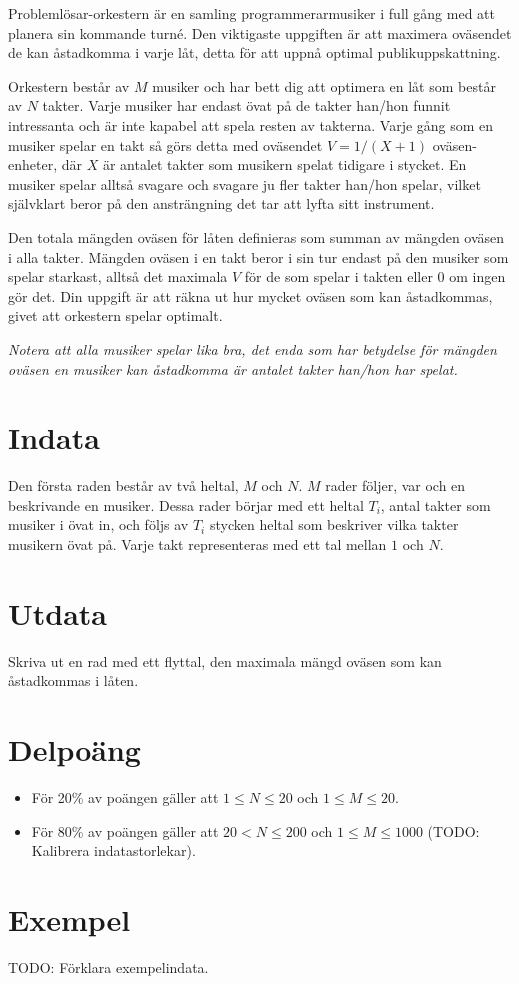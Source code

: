 
Problemlösar-orkestern är en samling programmerarmusiker i full gång med att planera sin kommande turné. Den viktigaste uppgiften är att maximera oväsendet de kan åstadkomma i varje låt, detta för att uppnå optimal publikuppskattning.

Orkestern består av $M$ musiker och har bett dig att optimera en låt som består av $N$ takter. Varje musiker har endast övat på de takter han/hon funnit intressanta och är inte kapabel att spela resten av takterna. Varje gång som en musiker spelar en takt så görs detta med oväsendet $V=1/(X+1)$ oväsen-enheter, där $X$ är antalet takter som musikern spelat tidigare i stycket. En musiker spelar alltså svagare och svagare ju fler takter han/hon spelar, vilket självklart beror på den ansträngning det tar att lyfta sitt instrument.

Den totala mängden oväsen för låten definieras som summan av mängden oväsen i alla takter. Mängden oväsen i en takt beror i sin tur endast på den musiker som spelar starkast, alltså det maximala $V$ för de som spelar i takten eller $0$ om ingen gör det. Din uppgift är att räkna ut hur mycket oväsen som kan åstadkommas, givet att orkestern spelar optimalt.

\emph{Notera att alla musiker spelar lika bra, det enda som har betydelse för mängden oväsen en musiker kan åstadkomma är antalet takter han/hon har spelat.}

\section*{Indata}
Den första raden består av två heltal, $M$ och $N$. $M$ rader följer, var och en beskrivande en musiker. Dessa rader börjar med ett heltal $T_i$, antal takter som musiker i övat in, och följs av $T_i$ stycken heltal som beskriver vilka takter musikern övat på. Varje takt representeras med ett tal mellan $1$ och $N$.

\section*{Utdata}
Skriva ut en rad med ett flyttal, den maximala mängd oväsen som kan åstadkommas i låten.

\section*{Delpoäng}
\begin{itemize}
\item För 20\% av poängen gäller att $1 \leq N \leq 20$ och $1 \leq M \leq 20$.
\item För 80\% av poängen gäller att $20 < N \leq 200$ och $1 \leq M \leq 1000$ (TODO: Kalibrera indatastorlekar).
\end{itemize}

\section*{Exempel}
TODO: Förklara exempelindata.
